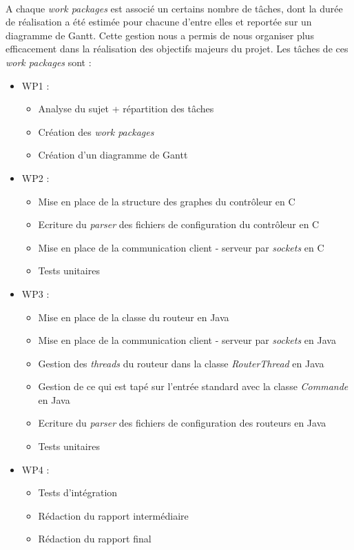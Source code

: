 \paragraph{}A chaque \textit{work packages} est associé un certains nombre de tâches, dont la durée de réalisation a été estimée pour chacune d'entre elles et reportée sur un diagramme de Gantt. Cette gestion nous a permis de nous organiser plus efficacement dans la réalisation des objectifs majeurs du projet.
\newpage
    Les tâches de ces \textit{work packages} sont :
\begin{itemize}
\item WP1 :
    \begin{itemize}
	\item Analyse du sujet + répartition des tâches
	\item Création des \textit{work packages}
	\item Création d'un diagramme de Gantt
    \end{itemize}
\vspace{1em}
\item WP2 :
    \begin{itemize}
	\item Mise en place de la structure des graphes du contrôleur en C
	\item Ecriture du \textit{parser} des fichiers de configuration du contrôleur en C
	\item Mise en place de la communication client - serveur par \textit{sockets} en C
	\item Tests unitaires
    \end{itemize}
\vspace{1em}
\item WP3 :
    \begin{itemize}
	\item Mise en place de la classe du routeur en Java
	\item Mise en place de la communication client - serveur par \textit{sockets} en Java
	\item Gestion des \textit{threads} du routeur dans la classe \textit{RouterThread} en Java
	\item Gestion de ce qui est tapé sur l'entrée standard avec la classe \textit{Commande} en Java
	\item Ecriture du \textit{parser} des fichiers de configuration des routeurs en Java
	\item Tests unitaires
    \end{itemize}
\vspace{1em}
\item WP4 :
    \begin{itemize}
	\item Tests d'intégration
	\item Rédaction du rapport intermédiaire
	\item Rédaction du rapport final
    \end{itemize}
\end{itemize}
